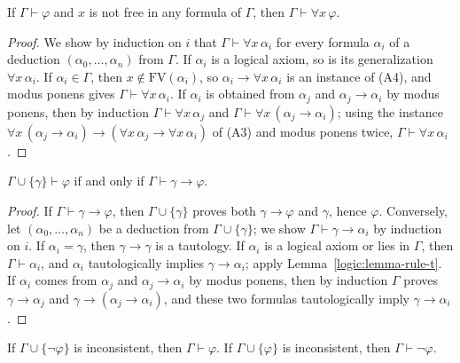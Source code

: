 \begin{theorem}\label{logic:theorem-generalization}
If $\Gamma \vdash \varphi$ and $x$ is not free in any formula of $\Gamma$, then
$\Gamma \vdash \forall x\,\varphi$.
\end{theorem}

\begin{proof}
We show by induction on $i$ that $\Gamma \vdash \forall x\,\alpha_i$ for every
formula $\alpha_i$ of a deduction $(\alpha_0, \ldots, \alpha_n)$ from $\Gamma$.
If $\alpha_i$ is a logical axiom, so is its generalization
$\forall x\,\alpha_i$. If $\alpha_i \in \Gamma$, then
$x \notin \mathrm{FV}(\alpha_i)$, so $\alpha_i \to \forall x\,\alpha_i$ is an
instance of (A4), and modus ponens gives $\Gamma \vdash \forall x\,\alpha_i$.
If $\alpha_i$ is obtained from $\alpha_j$ and $\alpha_j \to \alpha_i$ by modus
ponens, then by induction $\Gamma \vdash \forall x\,\alpha_j$ and
$\Gamma \vdash \forall x\,(\alpha_j \to \alpha_i)$; using the instance
$\forall x\,(\alpha_j \to \alpha_i) \to (\forall x\,\alpha_j \to \forall x\,\alpha_i)$
of (A3) and modus ponens twice, $\Gamma \vdash \forall x\,\alpha_i$.
\end{proof}

\begin{theorem}\label{logic:theorem-deduction}
$\Gamma \cup \{\gamma\} \vdash \varphi$ if and only if
$\Gamma \vdash \gamma \to \varphi$.
\end{theorem}

\begin{proof}
If $\Gamma \vdash \gamma \to \varphi$, then $\Gamma \cup \{\gamma\}$ proves both
$\gamma \to \varphi$ and $\gamma$, hence $\varphi$. Conversely, let
$(\alpha_0, \ldots, \alpha_n)$ be a deduction from $\Gamma \cup \{\gamma\}$; we
show $\Gamma \vdash \gamma \to \alpha_i$ by induction on $i$. If
$\alpha_i = \gamma$, then $\gamma \to \gamma$ is a tautology. If $\alpha_i$ is a
logical axiom or lies in $\Gamma$, then $\Gamma \vdash \alpha_i$, and $\alpha_i$
tautologically implies $\gamma \to \alpha_i$; apply
Lemma~\ref{logic:lemma-rule-t}. If $\alpha_i$ comes from $\alpha_j$ and
$\alpha_j \to \alpha_i$ by modus ponens, then by induction $\Gamma$ proves
$\gamma \to \alpha_j$ and $\gamma \to (\alpha_j \to \alpha_i)$, and these two
formulas tautologically imply $\gamma \to \alpha_i$.
\end{proof}

\begin{corollary}\label{logic:corollary-reductio}
If $\Gamma \cup \{\neg\varphi\}$ is inconsistent, then $\Gamma \vdash \varphi$. If
$\Gamma \cup \{\varphi\}$ is inconsistent, then $\Gamma \vdash \neg\varphi$.
\end{corollary}

